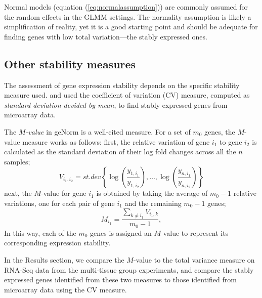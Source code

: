 \documentclass[letterpaper,12pt]{article}
\begin{document}
Normal models (equation (\ref{eq:normalassumption})) are commonly assumed for
the random effects in the GLMM settings. The normality assumption is likely a
simplification of reality, yet it is a good starting point and should be
adequate for finding genes with low total variation---the stably expressed
ones.

\subsection{Other stability measures}\label{subsection:OtherStabilityMeasure}
The assessment of gene expression stability depends on the specific stability
measure used. 
\cite{czechowski2005genome} and \cite{dekkers2012identification} used  the
coefficient of variation (CV) measure, computed as \textit{standard
deviation devided by mean}, to find stably expressed genes from microarray data.


The \textit{$M$-value} in geNorm \citep{vandesompele2002accurate} is a
well-cited measure. For a set of $m_0$ genes, the $M$-value measure works as
follows: first, the relative variation of gene $i_1$ to gene $i_2$ is calculated as the standard deviation
of their log fold changes
across all the $n$ samples; 
 	\[V_{i_1, i_2} =\textit{st.dev} \left\{\log\left(\dfrac{y_{1,i_1}}{y_{1, i_2}}\right),\ldots, \log\left(\dfrac{y_{n, i_1}}{y_{n, i_2}}\right) \right\}\]
 next, the $M$-value for gene 
 $i_1$ is obtained by taking the average of $m_0-1$ relative variations, one
for each pair of gene $i_1$ and the remaining $m_0-1$ genes;
\[M_{i_1} = \frac{\sum_{k\neq i_1}V_{i_1, k}}{m_0-1},\] 
In this way,  each of the $m_0$ genes is assigned an $M$ value to represent its corresponding expression stability. 
			

In the Results section, we compare the $M$-value to the total variance measure
on RNA-Seq data from the multi-tissue group experiments, and compare the
stably expressed genes identified from these two measures to those identified
from microarray data using the CV measure.

%
%
	
\end{document}
